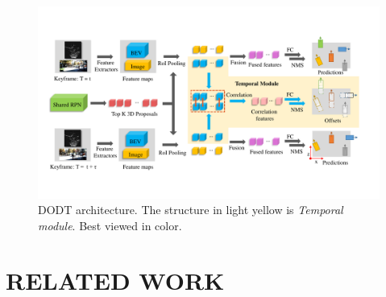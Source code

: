 \documentclass[letterpaper, 10pt, conference]{ieeeconf}  %
\begin{document}
\begin{figure}
	\vspace{-0.8cm}
	\rule{0pt}{1ex}
	\begin{center}
		\includegraphics[trim={1.1cm, 2.8cm, 1.5cm, 3cm}, clip, width=\textwidth]{images/structure2.pdf}
	\end{center}
	\setlength{\abovecaptionskip}{-1pt}
	\caption{DODT architecture. The structure in light yellow is \textit{Temporal module}. Best viewed in color.}
	\label{fig:dodt}
	\vspace{-0.6cm}
\end{figure}

\section{RELATED WORK}
\end{document}
